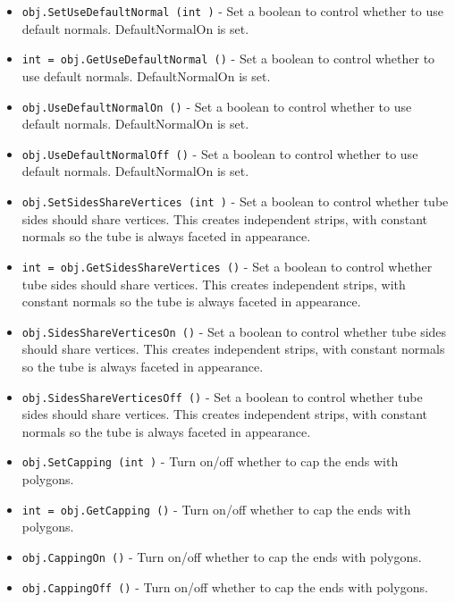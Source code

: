 \begin{itemize}
\item  \verb|obj.SetUseDefaultNormal (int )| -  Set a boolean to control whether to use default normals.
 DefaultNormalOn is set.

\item  \verb|int = obj.GetUseDefaultNormal ()| -  Set a boolean to control whether to use default normals.
 DefaultNormalOn is set.

\item  \verb|obj.UseDefaultNormalOn ()| -  Set a boolean to control whether to use default normals.
 DefaultNormalOn is set.

\item  \verb|obj.UseDefaultNormalOff ()| -  Set a boolean to control whether to use default normals.
 DefaultNormalOn is set.

\item  \verb|obj.SetSidesShareVertices (int )| -  Set a boolean to control whether tube sides should share vertices.
 This creates independent strips, with constant normals so the
 tube is always faceted in appearance.

\item  \verb|int = obj.GetSidesShareVertices ()| -  Set a boolean to control whether tube sides should share vertices.
 This creates independent strips, with constant normals so the
 tube is always faceted in appearance.

\item  \verb|obj.SidesShareVerticesOn ()| -  Set a boolean to control whether tube sides should share vertices.
 This creates independent strips, with constant normals so the
 tube is always faceted in appearance.

\item  \verb|obj.SidesShareVerticesOff ()| -  Set a boolean to control whether tube sides should share vertices.
 This creates independent strips, with constant normals so the
 tube is always faceted in appearance.

\item  \verb|obj.SetCapping (int )| -  Turn on/off whether to cap the ends with polygons.

\item  \verb|int = obj.GetCapping ()| -  Turn on/off whether to cap the ends with polygons.

\item  \verb|obj.CappingOn ()| -  Turn on/off whether to cap the ends with polygons.

\item  \verb|obj.CappingOff ()| -  Turn on/off whether to cap the ends with polygons.


\end{itemize}
